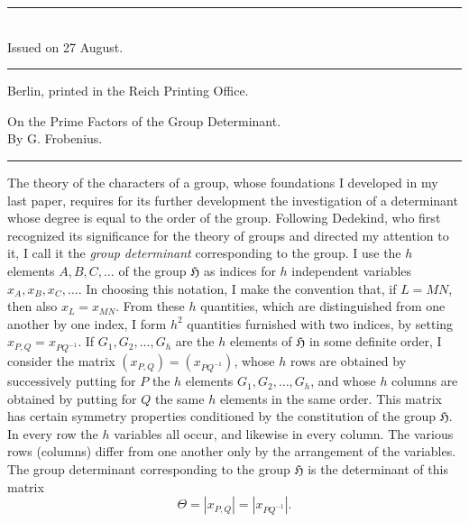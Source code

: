\documentclass[11pt]{article}
\newcommand{\Hgrp}{\mathfrak{H}}
\begin{document}
\begin{center}
\rule{11em}{0.4pt}\\[-0.2em]
Issued on 27 August.\\[-0.2em]
\rule{11em}{0.4pt}

{\small Berlin, printed in the Reich Printing Office.}
\end{center}

\clearpage

\begin{center}
{\Large On the Prime Factors of the Group Determinant.}\\[0.65em]
By G. Frobenius.\\[0.6em]
\rule{0.22\linewidth}{0.4pt}
\end{center}

The theory of the characters of a group, whose foundations I developed in my last paper, requires for its further development the investigation of a determinant whose degree is equal to the order of the group. Following Dedekind, who first recognized its significance for the theory of groups and directed my attention to it, I call it the \emph{group determinant} corresponding to the group. I use the $h$ elements $A,B,C,\ldots$ of the group $\Hgrp$ as indices for $h$ independent variables $x_A,x_B,x_C,\ldots$. In choosing this notation, I make the convention that, if $L=MN$, then also $x_L=x_{MN}$. From these $h$ quantities, which are distinguished from one another by one index, I form $h^2$ quantities furnished with two indices, by setting $x_{P,Q}=x_{PQ^{-1}}$. If $G_1,G_2,\ldots,G_h$ are the $h$ elements of $\Hgrp$ in some definite order, I consider the matrix $(x_{P,Q})=(x_{PQ^{-1}})$, whose $h$ rows are obtained by successively putting for $P$ the $h$ elements $G_1,G_2,\ldots,G_h$, and whose $h$ columns are obtained by putting for $Q$ the same $h$ elements in the same order. This matrix has certain symmetry properties conditioned by the constitution of the group $\Hgrp$. In every row the $h$ variables all occur, and likewise in every column. The various rows (columns) differ from one another only by the arrangement of the variables. The group determinant corresponding to the group $\Hgrp$ is the determinant of this matrix
\[
\Theta=|x_{P,Q}|=|x_{PQ^{-1}}|.
\]
\end{document}
